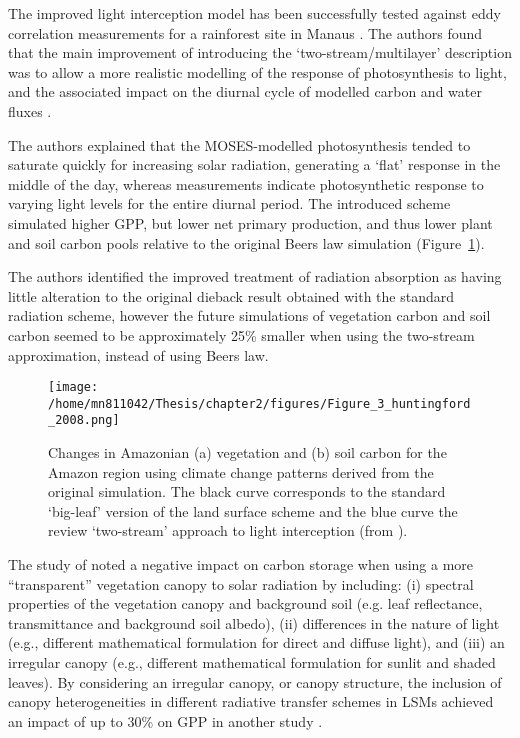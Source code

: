 The improved light interception model has been successfully tested against eddy correlation measurements for a rainforest site in Manaus \citep{Mercado2007}. The authors found that the main improvement of introducing the `two-stream/multilayer' description was to allow a more realistic modelling of the response of photosynthesis to light, and the associated impact on the diurnal cycle of modelled carbon and water fluxes \citep{Huntingford2008}. 

The authors explained that the MOSES-modelled photosynthesis tended to saturate quickly for increasing solar radiation, generating a `flat' response in the middle of the day, whereas measurements indicate photosynthetic response to varying light levels for the entire diurnal period. The introduced scheme simulated higher GPP, but lower net primary production, and thus lower plant and soil carbon pools relative to the original Beer\textquotesingle s law simulation (Figure~\ref{f:huntingford2008}). 

The authors identified the improved treatment of radiation absorption as having little alteration to the original dieback result obtained with the standard radiation scheme, however the future simulations of vegetation carbon and soil carbon seemed to be approximately 25\% smaller when using the two-stream approximation, instead of using Beer\textquotesingle s law. 

\begin{figure}[ht!]
\centering
\texttt{[image: /home/mn811042/Thesis/chapter2/figures/Figure\_3\_huntingford\_2008.png]}
\caption{Changes in Amazonian (a) vegetation and (b) soil carbon for the Amazon region using climate change patterns derived from the original \citet{Cox2000} simulation. The black curve corresponds to the standard `big-leaf' version of the land surface scheme and the blue curve the review `two-stream' approach to light interception (from \citep{Huntingford2008}).}
\label{f:huntingford2008}
\end{figure}

The study of \citet{Huntingford2008} noted a negative impact on carbon storage when using a more ``transparent'' vegetation canopy to solar radiation by including: (i) spectral properties of the vegetation canopy and background soil (e.g. leaf reflectance, transmittance and background soil albedo), (ii) differences in the nature of light (e.g., different mathematical formulation for direct and diffuse light), and (iii) an irregular canopy (e.g., different mathematical formulation for sunlit and shaded leaves). 
By considering an irregular canopy, or canopy structure, the inclusion of canopy heterogeneities in different radiative transfer schemes in LSMs achieved an impact of up to 30\% on GPP in another study \citep{Alton2007}.

